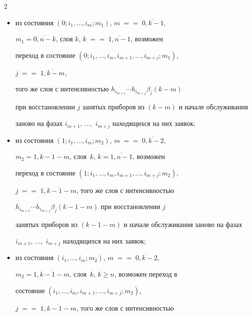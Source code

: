 \begin{multicols}{2}
\begin{itemize}


\item из состояния $\left(0;i_1,\ldots,i_m;m_1\right)$, $m\;=$\linebreak $=\;\overline{0,k-1}$,


$m_1=\overline{0,n-k}$, слоя $k$, $k\;=$\linebreak $=\;\overline{1,n-1}$, возможен


переход в состояние $\left(0;i_1,\ldots,i_{m},i_{m+1},\ldots,i_{m+j};m_1\right)$,


$j\;=$\linebreak $=\;\overline{1,k-m}$,


того же слоя с интенсивностью $h_{i_{m+1}}\cdots h_{i_{m+j}}\beta_j(k-m)$


при восстановлении $j$ занятых приборов из $(k-m)$ и начале обслуживания


заново на фазах $i_{m+1},\,\ldots,$ $i_{m+j}$ находящихся на них заявок;


\item


 из состояния $(1;i_1,\ldots,i_m;m_2)$, $m\;=$\linebreak $=\;\overline{0,k-2}$,


$m_2=\overline{1,k-1-m}$, слоя~$k$, $k=\overline{1,n-1}$, возможен


переход в состояние $\left(1;i_1,\ldots,i_{m},i_{m+1},\ldots,i_{m+j};m_2\right)$,


$j\;=$\linebreak $=\;\overline{1,k-1-m}$, того же слоя с интенсивностью


$h_{i_{m+1}}\cdots h_{i_{m+j}}\beta_j(k-1-m)$ при восстановлении $j$


занятых приборов из $(k-1-m)$ и начале обслуживания заново на фазах


$i_{m+1},\,\ldots,$ $i_{m+j}$ находящихся на них заявок;


\item


 из состояния $\left(i_1,\ldots,i_m;m_2\right)$, $m\;=$\linebreak $=\;\overline{0,k-2}$,


$m_2=\overline{1,k-1-m}$, слоя~$k$, $k\ge n$, возможен переход в


состояние $\left(i_1,\ldots,i_{m},i_{m+1},\ldots,i_{m+j};m_2\right)$,


$j\;=$\linebreak $=\;\overline{1,k-1-m}$, того же слоя с интенсивностью



\end{itemize}
\end{multicols}
